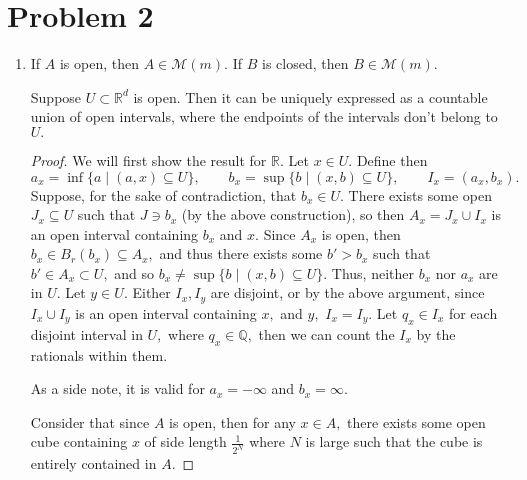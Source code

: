 \documentclass[11pt]{article}
\newcommand{\bbQ}{\mathbb{Q}}
\newcommand{\bbR}{\mathbb{R}}
\begin{document}
\newpage

\newpage
\section*{Problem 2}
\begin{problem}
    \begin{enumerate}
        \item If $A$ is open, then $A \in \mathcal{M}(m).$ If $B$ is closed, then $B \in \mathcal{M}(m).$
        \begin{solution}
            \begin{lemma}
                Suppose $U\subset \bbR^d$ is open. Then it can be uniquely expressed as a countable union of open intervals, where the endpoints of the intervals don't belong to $U.$ 
            \end{lemma} 
            \begin{proof}
         We will first show the result for $\bbR.$ 
                Let $x\in U.$ Define then 
                \[a_x = \inf\{a \mid (a,x) \subseteq U\}, \qquad b_x = \sup\{b \mid (x,b)\subseteq U\}, \qquad I_x = (a_x, b_x).\]  Suppose, for the sake of contradiction, that $b_x \in U.$ There exists some open $J_x \subseteq U$ such that $J \ni b_x$ (by the above construction), so then $A_x = J_x \cup I_x$ is an open interval containing $b_x$ and $x.$ Since $A_x$ is open, then $b_x \in B_r(b_x) \subseteq A_x,$ and thus there exists some $b' >b_x$ such that $b' \in A_x \subset U,$ and so $b_x \neq \sup\{b \mid (x,b) \subseteq U\}.$ Thus, neither $b_x$ nor $a_x$ are in $U.$ Let $y\in U.$ Either $I_x, I_y$ are disjoint, or by the above argument, since $I_x \cup I_y$ is an open interval containing $x,$ and $y,$ $I_x = I_y.$ Let $q_x \in I_x$ for each disjoint interval in $U,$ where $q_x \in \bbQ,$ then we can count the $I_x$ by the rationals within them. 

        

                As a side note, it is valid for $a_x = -\infty$ and $b_x = \infty.$

        Consider that since $A$ is open, then for any $x\in A,$ there exists some open cube containing $x$ of side length $\frac{1}{2^N}$ where $N$ is large such that the cube is entirely contained in $A.$
        

\end{proof}
\end{solution}
\end{enumerate}
\end{problem}
\end{document}
